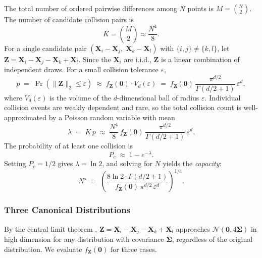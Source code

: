 \documentclass{article}
\newcommand{\vect}[1]{\mathbf{#1}}
\newcommand{\mat}[1]{\mathbf{#1}}
\begin{document}
The total number of ordered pairwise differences among $N$ points is $M = \binom{N}{2}$. The number of candidate collision pairs is
\begin{equation}
    K = \binom{M}{2} \approx \frac{N^4}{8}.
\end{equation}
For a single candidate pair $(\vect{X}_i - \vect{X}_j,\; \vect{X}_k - \vect{X}_l)$ with $\{i,j\} \neq \{k,l\}$, let $\vect{Z} = \vect{X}_i - \vect{X}_j - \vect{X}_k + \vect{X}_l$. Since the $\vect{X}_i$ are i.i.d., $\vect{Z}$ is a linear combination of independent draws. For a small collision tolerance $\varepsilon$,
\begin{equation}
\label{eq:p_single}
    p \;=\; \Pr(\|\vect{Z}\|_2 \le \varepsilon)
       \;\approx\; f_{\vect{Z}}(\vect{0}) \cdot V_d(\varepsilon)
       \;=\; f_{\vect{Z}}(\vect{0}) \, \frac{\pi^{d/2}}{\Gamma(d/2 + 1)} \, \varepsilon^d,
\end{equation}
where $V_d(\varepsilon)$ is the volume of the $d$-dimensional ball of radius $\varepsilon$. Individual collision events are weakly dependent and rare, so the total collision count is well-approximated by a Poisson random variable \citep{barbour1992poisson} with mean
\begin{equation}
\label{eq:lambda}
    \lambda \;=\; K \, p \;\approx\; \frac{N^4}{8} \, f_{\vect{Z}}(\vect{0}) \, \frac{\pi^{d/2}}{\Gamma(d/2 + 1)} \, \varepsilon^d.
\end{equation}
The probability of at least one collision is
\begin{equation}
\label{eq:Pc}
    P_c \;\approx\; 1 - e^{-\lambda}.
\end{equation}
Setting $P_c = 1/2$ gives $\lambda = \ln 2$, and solving for $N$ yields the \emph{capacity}:
\begin{equation}
\label{eq:capacity}
    N^\star \;=\; \left( \frac{8 \ln 2 \cdot \Gamma(d/2 + 1)}{f_{\vect{Z}}(\vect{0}) \, \pi^{d/2} \, \varepsilon^d} \right)^{1/4}.
\end{equation}

\subsubsection{Three Canonical Distributions}

By the central limit theorem \citep{durrett2019probability}, $\vect{Z} = \vect{X}_i - \vect{X}_j - \vect{X}_k + \vect{X}_l$ approaches $\mathcal{N}(\vect{0}, 4\mat{\Sigma})$ in high dimension for any distribution with covariance $\mat{\Sigma}$, regardless of the original distribution. We evaluate $f_{\vect{Z}}(\vect{0})$ for three cases.
\end{document}
